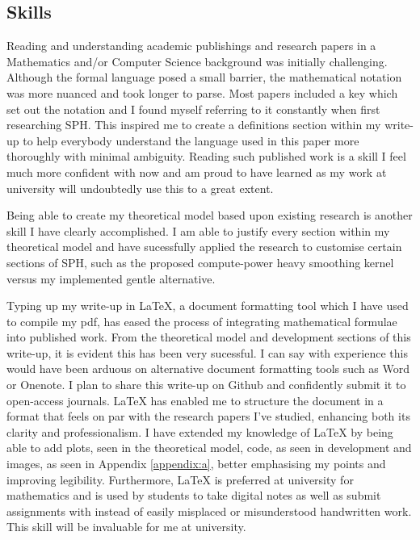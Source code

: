\documentclass[write-up.tex]{subfiles}
\begin{document}
 \subsection{Skills}
Reading and understanding academic publishings and research papers in a Mathematics and/or Computer Science background was initially challenging. Although the formal language posed a small barrier, the mathematical notation was more nuanced and took longer to parse. Most papers included a key which set out the notation and I found myself referring to it constantly when first researching SPH. This inspired me to create a definitions section within my write-up to help everybody understand the language used in this paper more thoroughly with minimal ambiguity. Reading such published work is a skill I feel much more confident with now and am proud to have learned as my work at university will undoubtedly use this to a great extent.

Being able to create my theoretical model based upon existing research is another skill I have clearly accomplished. I am able to justify every section within my theoretical model and have sucessfully applied the research to customise certain sections of SPH, such as the proposed compute-power heavy smoothing kernel versus my implemented gentle alternative.

Typing up my write-up in LaTeX, a document formatting tool which I have used to compile my pdf, has eased the process of integrating mathematical formulae into published work. From the theoretical model and development sections of this write-up, it is evident this has been very sucessful. I can say with experience this would have been arduous on alternative document formatting tools such as Word or Onenote. I plan to share this write-up on Github and confidently submit it to open-access journals. LaTeX has enabled me to structure the document in a format that feels on par with the research papers I’ve studied, enhancing both its clarity and professionalism. I have extended my knowledge of LaTeX by being able to add plots, seen in the theoretical model, code, as seen in development and images, as seen in Appendix \ref{appendix:a}, better emphasising my points and improving legibility. Furthermore, LaTeX is preferred at university for mathematics and is used by students to take digital notes as well as submit assignments with instead of easily misplaced or misunderstood handwritten work. This skill will be invaluable for me at university.
\end{document}
